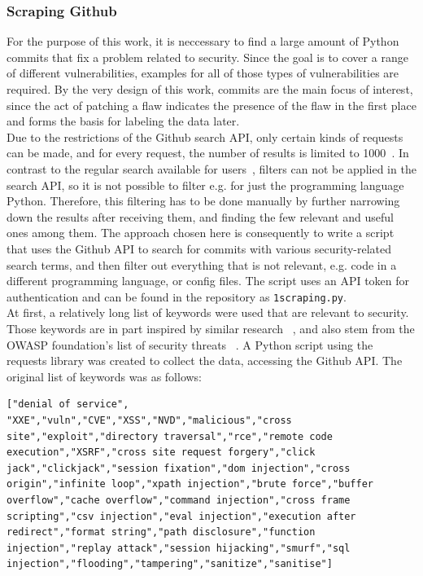 \documentclass[
	a4paper,
	pagesize,
	pdftex,
	12pt,
	twoside, %
	BCOR=5mm, %
	ngerman,
	fleqn,
	final,
	]{scrartcl}
\begin{document}
\subsubsection{Scraping Github}
For the purpose of this work, it is neccessary to find a large amount of Python commits that fix a problem related to security. Since the goal is to cover a range of different vulnerabilities, examples for all of those types of vulnerabilities are required. By the very design of this work, commits are the main focus of interest, since the act of patching a flaw indicates the presence of the flaw in the first place and forms the basis for labeling the data later.\\	
Due to the restrictions of the Github search API, only certain kinds of requests can be made, and for every request, the number of results is limited to 1000~\cite{Github.com.2}. In contrast to the regular search available for users~\cite{Github.com.2019}, filters can not be applied in the search API, so it is not possible to filter e.g. for just the programming language Python. Therefore, this filtering has to be done manually by further narrowing down the results after receiving them, and finding the few relevant and useful ones among them.
The approach chosen here is consequently to write a script that uses the Github API to search for commits with various security-related search terms, and then filter out everything that is not relevant, e.g. code in a different programming language, or config files. The script uses an API token for authentication and can be found in the repository as \texttt{1scraping.py}.\\
At first, a relatively long list of keywords were used that are relevant to security. Those keywords are in part inspired by similar research ~\cite{Zhou.2017}, and also stem from the OWASP foundation's list of security threats ~\cite{OWASPFoundation.}. A Python script using the requests library was created to collect the data, accessing the Github API. The original list of keywords was as follows:
\lstset{basicstyle=\small}
\begin{lstlisting}
["denial of service", "XXE","vuln","CVE","XSS","NVD","malicious","cross site","exploit","directory traversal","rce","remote code execution","XSRF","cross site request forgery","click jack","clickjack","session fixation","dom injection","cross origin","infinite loop","xpath injection","brute force","buffer overflow","cache overflow","command injection","cross frame scripting","csv injection","eval injection","execution after redirect","format string","path disclosure","function injection","replay attack","session hijacking","smurf","sql injection","flooding","tampering","sanitize","sanitise"]
\end{lstlisting}
\end{document}
